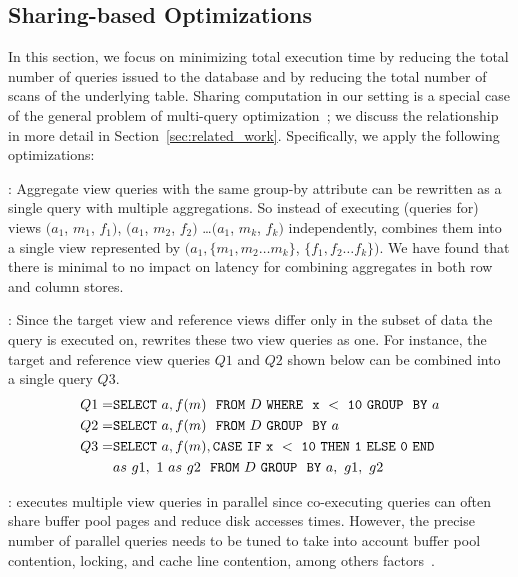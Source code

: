 
\subsection{Sharing-based Optimizations}
\label{sec:sharing_opt}
In this section, we focus on minimizing total execution time
by reducing the
total number of queries issued to the database
and by reducing the total number of scans of the underlying table.
Sharing computation in our setting is a special case of the general problem
of multi-query optimization~\cite{DBLP:journals/tods/Sellis88}; we discuss the 
relationship in more detail in Section~\ref{sec:related_work}.
Specifically, we apply the following optimizations:

: Aggregate view queries 
with the same group-by attribute can be 
rewritten as a single query with multiple aggregations. 
So instead of executing
(queries for) views $(a_1$, $m_1$, $f_1)$, $(a_1$, $m_2$, $f_2)$ \ldots $(a_1$, $m_k$, $f_k)$
independently, \SeeDB combines them into a single view represented by
$(a_1, \{m_1, m_2\ldots m_k\}$, $\{f_1, f_2\ldots f_k\})$.  
We have found that there is minimal to no impact on latency 
for combining aggregates in both row and column stores. 

:
Since the target view and reference views differ only in the subset of data
the query is executed on, \SeeDB rewrites these two view queries as
one. For instance, the target and reference view queries $Q1$ and $Q2$
shown below can be combined into a single query $Q3$.
\vspace{-5pt}
\begin{align*} 
Q1 = &{\tt SELECT \ } a, f(m) \ \ {\tt FROM} \  D\  {\tt WHERE \ \ x\ <\ 10\
GROUP \ \ BY} \ a \\
Q2 = &{\tt SELECT \ } a, f(m) \ \ {\tt FROM} \  D\  {\tt GROUP \ \ BY} \ a \\
Q3 = &{\tt SELECT \ } a, f(m), {\tt CASE\ IF\ x\ <\ 10\ THEN\ 1\ ELSE\ 0\
END}\\ 
&as\ g1,\ 1\ as\ g2 \ \ {\tt FROM} \ D\ {\tt GROUP \ \ BY} \ a,\ g1,\ g2
\end{align*}

:
  \SeeDB executes multiple view queries in parallel since co-executing queries can often
 share buffer pool pages and reduce disk accesses times. 
  However, the precise number of parallel queries needs to be tuned to take into account 
  buffer pool contention, locking, and cache line contention, among others factors~\cite{Postgres_wiki}.  

